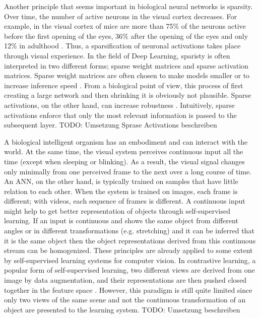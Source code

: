 Another principle that seems important in biological neural networks is sparsity.
Over time, the number of active neurons in the visual cortex decreases.
For example, in the visual cortex of mice are more than 75\% of the neurons active before the first opening of the eyes, 36\% after the opening of the eyes and only 12\% in adulthood .
Thus, a sparsification of neuronal activations takes place through visual experience.
In the field of Deep Learning, sparisty is often interpreted in two different forms; sparse weight matrices and sparse activation matrices.
Sparse weight matrices are often chosen to make models smaller or to increase inference speed \cite{Louizos_Welling_Kingma_2018, Nun_Dryden_Peste_2021}.
From a biological point of view, this process of first creating a large network and then shrinking it is obviously not plausible.
Sparse activations, on the other hand, can increase robustness \cite{Panousis_Chatzis_Theodoridis_2021}.
Intuitively, sparse activations enforce that only the most relevant information is passed to the subsequent layer.
TODO: Umsetzung Sprase Activations beschreiben

A biological intelligent organism has an embodiment and can interact with the world.
At the same time, the visual system perceives continuous input all the time (except when sleeping or blinking).
As a result, the visual signal changes only minimally from one perceived frame to the next over a long course of time.
An ANN, on the other hand, is typically trained on samples that have little relation to each other.
When the system is trained on images, each frame is different; with videos, each sequence of frames is different.
A continuous input might help to get better representation of objects through self-supervised learning.
If an input is continuous and shows the same object from different angles or in different transformations (e.g. stretching) and it can be inferred that it is the same object then the object representations derived from this continuous stream can be homogenized.
These principles are already applied to some extent by self-supervised learning systems for computer vision.
In contrastive learning, a popular form of self-supervised learning, two different views are derived from one image by data augmentation, and their representations are then pushed closed together in the feature space .
However, this paradigm is still quite limited since only two views of the same scene and not the continuous transformation of an object are presented to the learning system.
TODO: Umsetzung beschreiben



